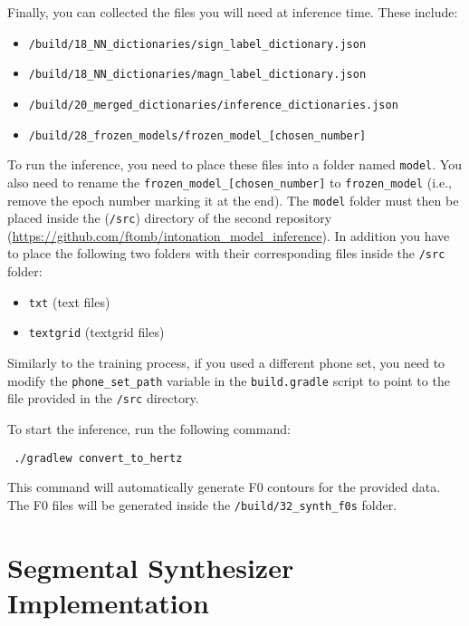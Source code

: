 Finally, you can collected the files you will need at inference time.
These include:

\begin{itemize}[noitemsep]
    \item \verb|/build/18_NN_dictionaries/sign_label_dictionary.json| 
    \item \verb|/build/18_NN_dictionaries/magn_label_dictionary.json|
    \item \verb|/build/20_merged_dictionaries/inference_dictionaries.json|
    \item \verb|/build/28_frozen_models/frozen_model_[chosen_number]|
\end{itemize}

To run the inference, you need to place these files into a folder named \verb|model|.
You also need to rename the \verb|frozen_model_[chosen_number]| to \verb|frozen_model| (i.e., remove the epoch number marking it at the end).
The \verb|model| folder must then be placed inside the (\verb|/src|) directory of the second repository (\url{https://github.com/ftomb/intonation_model_inference}).
In addition you have to place the following two folders with their corresponding files inside the \verb|/src| folder:

\begin{itemize}[noitemsep]
    \item \verb|txt| (text files)
    \item \verb|textgrid| (textgrid files)
\end{itemize}

Similarly to the training process, if you used a different phone set, you need to modify the \verb|phone_set_path| variable in the \verb|build.gradle| script to point to the file provided in the \verb|/src| directory.

To start the inference, run the following command:

\begin{verbatim}
 ./gradlew convert_to_hertz
\end{verbatim}

This command will automatically generate \ac{F0} contours for the provided data.
The \ac{F0} files will be generated inside the \verb|/build/32_synth_f0s| folder.









\section{Segmental Synthesizer Implementation}

